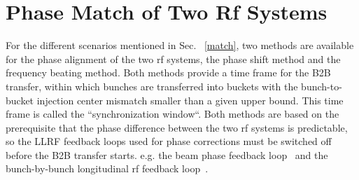 \section{Phase Match of Two Rf Systems}
\label{two_sync_methods}
For the different scenarios mentioned in Sec. ~\ref{match}, two methods are available for the phase alignment of the two rf systems, the phase shift method and the frequency beating method. Both methods provide a time frame for the B2B transfer, within which bunches are transferred into buckets with the bunch-to-bucket injection center mismatch smaller than a given upper bound. This time frame is called the ``synchronization window``. Both methods are based on the prerequisite that the phase difference between the two rf systems is predictable, so the LLRF feedback loops used for phase corrections must be switched off before the B2B transfer starts. e.g. the beam phase feedback loop~\cite{grieser_beam_2015} and the bunch-by-bunch longitudinal rf feedback loop~\cite{gross_bunch-by-bunch_2015}.




